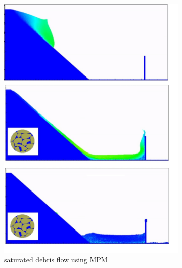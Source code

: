 \documentclass[preprint,12pt]{elsarticle}
\begin{document}
\begin{figure}
\center
\begin{subfigure}[c]{0.5\linewidth}
\includegraphics[width=\linewidth]{SHMPM.jpg}
\caption{saturated debris flow using MPM}
\label{saturatedflowa}
\end{subfigure}\hfill    
\begin{subfigure}[d]{0.5\linewidth}

\end{subfigure}
\end{figure}
\end{document}
